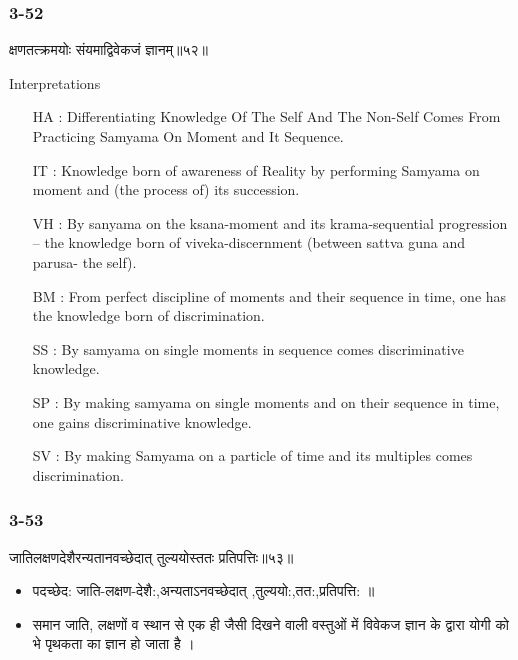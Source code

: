 \begin{frame}[fragile]\frametitle{3-52}
\begin{sanskrit}
क्षणतत्क्रमयोः संयमाद्विवेकजं ज्ञानम्॥५२॥
\end{sanskrit}

Interpretations
\begin{itemize}	
\item [HA]: Differentiating Knowledge Of The Self And The Non-Self Comes From Practicing Samyama On Moment and It Sequence.
\item [IT]: Knowledge born of awareness of Reality by performing Samyama on moment and (the process of) its succession.
\item [VH]: By sanyama on the ksana-moment and its krama-sequential progression – the knowledge born of viveka-discernment (between sattva guna and parusa- the self).
\item [BM]: From perfect discipline of moments and their sequence in time, one has the knowledge born of discrimination.
\item [SS]: By samyama on single moments in sequence comes discriminative knowledge.
\item [SP]: By making samyama on single moments and on their sequence in time, one gains discriminative knowledge.
\item [SV]: By making Samyama on a particle of time and its multiples comes discrimination. 
\end{itemize}
\end{frame}

\begin{frame}[fragile]\frametitle{3-53}
\begin{sanskrit}
जातिलक्षणदेशैरन्यतानवच्छेदात् तुल्ययोस्ततः प्रतिपत्तिः॥५३॥
\end{sanskrit}

\begin{itemize}
\item पदच्छेद:  जाति-लक्षण-देशै:,अन्यताऽनवच्छेदात् ,तुल्ययो:,तत:,प्रतिपत्ति: ॥
\item समान जाति, लक्षणों व स्थान से एक ही जैसी दिखने वाली वस्तुओं में विवेकज ज्ञान के द्वारा योगी को भे पृथकता का ज्ञान हो जाता है ।
\end{itemize}
\end{frame}


